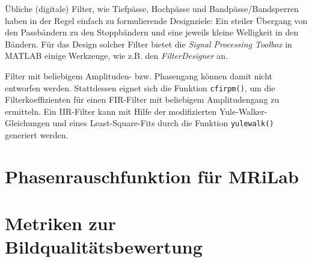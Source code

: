 Übliche (digitale) Filter, wie Tiefpässe, Hochpässe und Bandpässe/Bandsperren haben in der Regel einfach zu formulierende Designziele: Ein steiler Übergang von den Passbändern zu den Stoppbändern und eine jeweils kleine Welligkeit in den Bändern.
Für das Design solcher Filter bietet die \textit{Signal Processing Toolbox} in MATLAB einige Werkzeuge, wie z.B. den \textit{FilterDesigner} an.

Filter mit beliebigem Amplituden- bzw. Phasengang können damit nicht entworfen werden. Stattdessen eignet sich die Funktion \texttt{cfirpm()}, um die Filterkoeffizienten für einen FIR-Filter mit beliebigem Amplitudengang zu ermitteln. Ein IIR-Filter kann mit Hilfe der modifizierten Yule-Walker-Gleichungen und eines Least-Square-Fits durch die Funktion \texttt{yulewalk()} generiert werden.

\section{Phasenrauschfunktion für MRiLab}

\section{Metriken zur Bildqualitätsbewertung}
